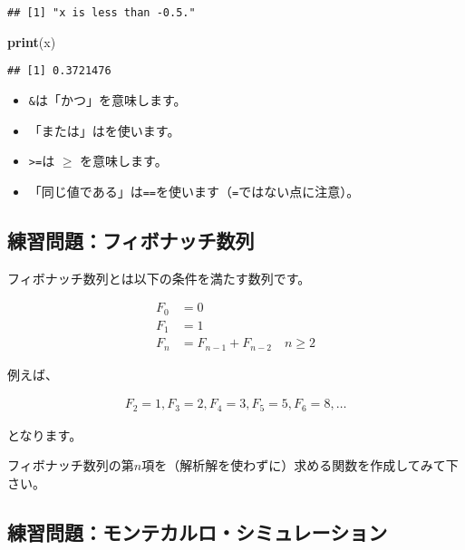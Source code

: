 \documentclass[]{bxjsarticle}
\newenvironment{Shaded}{\begin{snugshade}}{\end{snugshade}}
\newcommand{\KeywordTok}[1]{\textcolor[rgb]{0.13,0.29,0.53}{\textbf{#1}}}
\newcommand{\NormalTok}[1]{#1}
\providecommand{\tightlist}{%
  \setlength{\itemsep}{0pt}\setlength{\parskip}{0pt}}
\begin{document}
\begin{verbatim}
## [1] "x is less than -0.5."
\end{verbatim}

\begin{Shaded}
\begin{Highlighting}[]
\KeywordTok{print}\NormalTok{(x)}
\end{Highlighting}
\end{Shaded}

\begin{verbatim}
## [1] 0.3721476
\end{verbatim}

\begin{itemize}
\tightlist
\item
  \texttt{\&}は「かつ」を意味します。
\item
  「または」は\texttt{\textbar{}}を使います。
\item
  \texttt{\textgreater{}=}は \(\geq\) を意味します。
\item
  「同じ値である」は\texttt{==}を使います（\texttt{=}ではない点に注意）。
\end{itemize}

\hypertarget{ux7df4ux7fd2ux554fux984cux30d5ux30a3ux30dcux30caux30c3ux30c1ux6570ux5217}{%
\subsection{練習問題：フィボナッチ数列}\label{ux7df4ux7fd2ux554fux984cux30d5ux30a3ux30dcux30caux30c3ux30c1ux6570ux5217}}

フィボナッチ数列とは以下の条件を満たす数列です。

\[
\begin{aligned}
  F_0 &= 0 \\
  F_1 &= 1 \\
  F_{n} &= F_{n-1} + F_{n-2} \quad n \geq 2
\end{aligned}
\]

例えば、

\[
\begin{aligned}
  F_2 = 1, F_3 = 2, F_4 = 3, F_5 = 5, F_6 = 8,\ldots
\end{aligned}
\]

となります。

フィボナッチ数列の第\(n\)項を（解析解を使わずに）求める関数を作成してみて下さい。

\hypertarget{ux7df4ux7fd2ux554fux984cux30e2ux30f3ux30c6ux30abux30ebux30edux30b7ux30dfux30e5ux30ecux30fcux30b7ux30e7ux30f3}{%
\subsection{練習問題：モンテカルロ・シミュレーション}\label{ux7df4ux7fd2ux554fux984cux30e2ux30f3ux30c6ux30abux30ebux30edux30b7ux30dfux30e5ux30ecux30fcux30b7ux30e7ux30f3}}
\end{document}
